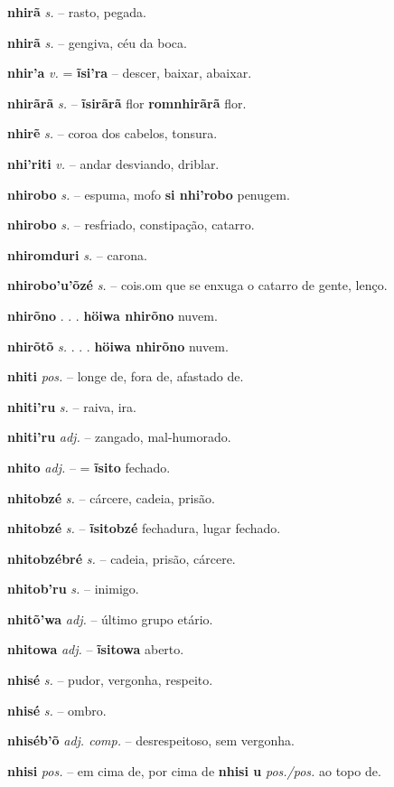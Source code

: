 \textbf{nhirã} \textit{s.} -- rasto, pegada.

\textbf{nhirã} \textit{s.} -- gengiva, céu da boca.

\textbf{nhir'a} \textit{v.} = \textbf{ĩsi'ra} -- descer, baixar, abaixar.

\textbf{nhirãrã} \textit{s.} -- \textbf{ĩsirãrã} flor  \textbf{romnhirãrã} flor.

\textbf{nhirẽ} \textit{s.} -- coroa dos cabelos, tonsura.

\textbf{nhi'riti} \textit{v.} -- andar desviando, driblar.

\textbf{nhirobo} \textit{s.} -- espuma, mofo  \textbf{si nhi'robo} penugem.

\textbf{nhirobo} \textit{s.} -- resfriado, constipação, catarro.

\textbf{nhiromduri} \textit{s.} -- carona.

\textbf{nhirobo'u'õzé} \textit{s.} -- cois.om que se enxuga o catarro de gente, lenço.

\textbf{nhirõno} . . .  \textbf{höiwa nhirõno} nuvem.

\textbf{nhirõtõ} \textit{s.} . . .  \textbf{höiwa nhirõno} nuvem.

\textbf{nhiti} \textit{pos.} -- longe de, fora de, afastado de.

\textbf{nhiti'ru} \textit{s.} -- raiva, ira.

\textbf{nhiti'ru} \textit{adj.} -- zangado, mal-humorado.

\textbf{nhito} \textit{adj.} -- = \textbf{ĩsito} fechado.

\textbf{nhitobzé} \textit{s.} -- cárcere, cadeia, prisão.

\textbf{nhitobzé} \textit{s.} -- \textbf{ĩsitobzé} fechadura, lugar fechado.

\textbf{nhitobzébré} \textit{s.} -- cadeia, prisão, cárcere.

\textbf{nhitob'ru} \textit{s.} -- inimigo.

\textbf{nhitõ'wa} \textit{adj.} -- último grupo etário.

\textbf{nhitowa} \textit{adj.} -- \textbf{ĩsitowa} aberto.

\textbf{nhisé} \textit{s.} -- pudor, vergonha, respeito.

\textbf{nhisé} \textit{s.} -- ombro.

\textbf{nhiséb'õ} \textit{adj. comp.} -- desrespeitoso, sem vergonha.

\textbf{nhisi} \textit{pos.} -- em cima de, por cima de  \textbf{nhisi u} \textit{pos./pos.} ao topo de.

